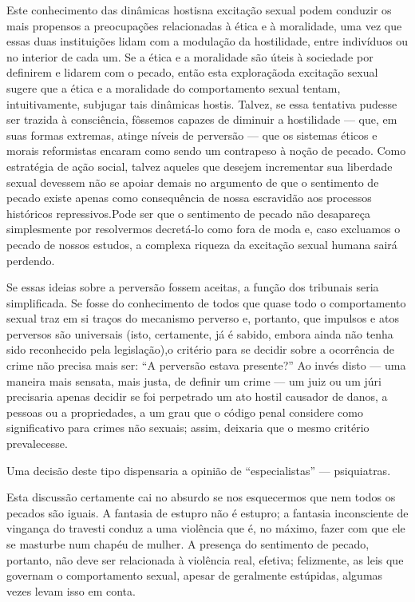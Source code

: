 Este conhecimento das dinâmicas hostis\idxhost[|(] na excitação sexual podem
conduzir os mais propensos a preocupações relacionadas à ética e à
moralidade, uma vez que essas duas instituições lidam com a modulação
da hostilidade, entre indivíduos ou no interior de cada um. Se a ética
e a moralidade são úteis à sociedade por definirem e lidarem com o
pecado, então esta exploração\idxsexul[|(] da excitação sexual sugere que a ética e
a moralidade do comportamento sexual tentam, intuitivamente, subjugar
tais dinâmicas hostis. Talvez, se essa tentativa pudesse ser trazida à
consciência, fôssemos capazes de diminuir a hostilidade --- que, em
suas formas extremas, atinge níveis de perversão --- que os sistemas
éticos e morais reformistas encaram como sendo um contrapeso à noção de
pecado. Como estratégia de ação social, talvez aqueles que desejem
incrementar sua liberdade sexual devessem não se apoiar demais no
argumento de que o sentimento de pecado existe apenas como consequência
de nossa escravidão aos processos históricos repressivos.\idxaspecrep[|)] Pode ser que
o sentimento de pecado não desapareça simplesmente por resolvermos
decretá-lo como fora de moda e, caso excluamos o pecado de nossos
estudos, a complexa riqueza da excitação sexual humana sairá
perdendo.

Se essas ideias sobre a perversão fossem aceitas,\idxcrime{} a função dos
tribunais seria simplificada. Se fosse do conhecimento de todos que
quase todo o comportamento sexual traz em si traços do mecanismo
perverso e, portanto, que impulsos e atos perversos são universais
(isto, certamente, já é sabido, embora ainda não tenha sido reconhecido
pela legislação),\idxleis[|(] o critério para se decidir sobre a ocorrência de
crime não precisa mais ser: ``A perversão estava
presente?'' Ao invés disto --- uma maneira mais sensata,
mais justa, de definir um crime --- um juiz ou um júri precisaria
apenas decidir se foi perpetrado um ato hostil causador de danos, a
pessoas ou a propriedades, a um grau que o código penal considere como
significativo para crimes não sexuais; assim, deixaria que o mesmo
critério prevalecesse.

Uma decisão deste tipo dispensaria a opinião de
``especialistas'' --- psiquiatras.

Esta discussão certamente cai no absurdo se nos esquecermos que nem
todos os pecados são iguais. A fantasia de estupro não é estupro; a
fantasia inconsciente de vingança do travesti conduz a uma violência
que é, no máximo, fazer com que ele se masturbe num chapéu de mulher. A
presença do sentimento de pecado, portanto, não deve ser relacionada à
violência real, efetiva; felizmente, as leis que governam o
comportamento sexual, apesar de geralmente estúpidas, algumas vezes
levam isso em conta.

